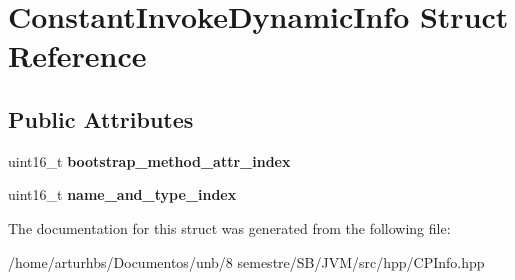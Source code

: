\hypertarget{structConstantInvokeDynamicInfo}{}\section{Constant\+Invoke\+Dynamic\+Info Struct Reference}
\label{structConstantInvokeDynamicInfo}
\subsection*{Public Attributes}
\begin{DoxyCompactItemize}
\item 
uint16\+\_\+t {\bfseries bootstrap\+\_\+method\+\_\+attr\+\_\+index}\hypertarget{structConstantInvokeDynamicInfo_a8e5bd368ad9065219095b4dba2c757e0}{}\label{structConstantInvokeDynamicInfo_a8e5bd368ad9065219095b4dba2c757e0}

\item 
uint16\+\_\+t {\bfseries name\+\_\+and\+\_\+type\+\_\+index}\hypertarget{structConstantInvokeDynamicInfo_a1455133fd2ed451ac27d38d7c289b4e4}{}\label{structConstantInvokeDynamicInfo_a1455133fd2ed451ac27d38d7c289b4e4}

\end{DoxyCompactItemize}


The documentation for this struct was generated from the following file\+:\begin{DoxyCompactItemize}
\item 
/home/arturhbs/\+Documentos/unb/8 semestre/\+S\+B/\+J\+V\+M/src/hpp/C\+P\+Info.\+hpp\end{DoxyCompactItemize}
